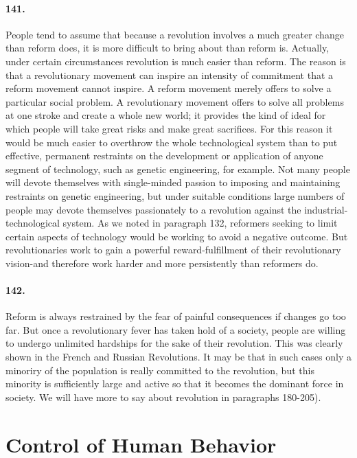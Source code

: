 \documentclass[12pt]{book}
\newcommand{\mysection}[1]{\section*{#1} \addcontentsline{toc}{section}{#1}}
\begin{document}
\paragraph{141.}  People tend to assume that because a revolution involves a much greater change than reform does, it is more difficult to bring about than reform is. Actually, under certain circumstances revolution is much easier than reform. The reason is that a revolutionary movement can inspire an intensity of commitment that a reform movement cannot inspire. A reform movement merely offers to solve a particular social problem. A revolutionary movement offers to solve all problems at one stroke and create a whole new world; it provides the kind of ideal for which people will take great risks and make great sacrifices. For this reason it would be much easier to overthrow the whole technological system than to put effective, permanent restraints on the development or application of anyone segment of technology, such as genetic engineering, for example. Not many people will devote themselves with single-minded passion to imposing and maintaining restraints on genetic engineering, but under suitable conditions large numbers of people may devote themselves passionately to a revolution against the industrial-technological system. As we noted in paragraph 132, reformers seeking to limit certain aspects of technology would be working to avoid a negative outcome. But revolutionaries work to gain a powerful reward-fulfillment of their revolutionary vision-and therefore work harder and more persistently than reformers do.


\paragraph{142.}  Reform is always restrained by the fear of painful consequences if changes go too far. But once a revolutionary fever has taken hold of a society, people are willing to undergo unlimited hardships for the sake of their revolution. This was clearly shown in the French and Russian Revolutions.  It may be that in such cases only a minoriry of the population is really committed to the revolution, but this minority is sufficiently large and active so that it becomes the dominant force in society. We will have more to say about revolution in paragraphs 180-205).

\mysection{Control of Human Behavior}
\end{document}
